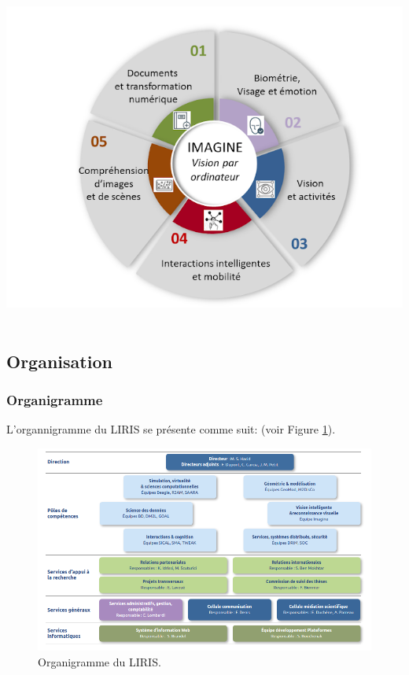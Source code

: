 \includegraphics[scale=0.4]{images/Imagine.png}~\\[0.8cm]


 

  \subsection{Organisation}
   \subsubsection{Organigramme}  
L'organnigramme du LIRIS se présente comme suit: 
(voir Figure \ref{fig:organigramme}).
 \begin{figure}[h!]
  \begin{center}
    \includegraphics[width=17cm]{images/OrganigrammeLiris.png}
\caption{Organigramme du LIRIS.\label{fig:organigramme}}
\end{center}
\end{figure}


